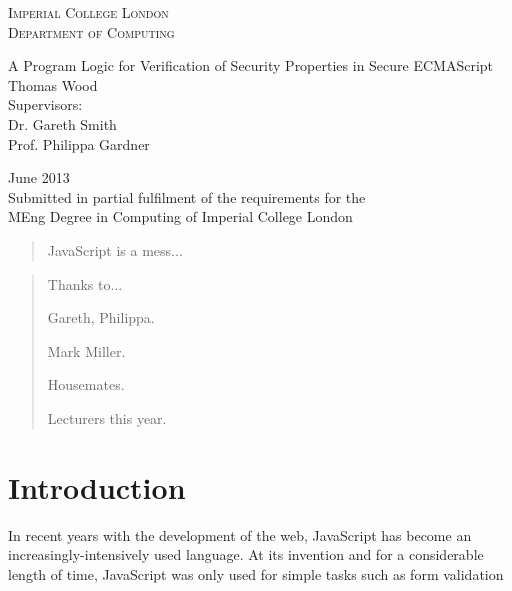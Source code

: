 \documentclass[a4paper]{report}
\begin{document}
\begin{titlepage}
\begin{center}
  \textsc{\Large Imperial College London} \\[0.1cm]
  \textsc{\Large Department of Computing}

  \vfill

  {\Huge A Program Logic for Verification of Security Properties in Secure
  ECMAScript} \\[3cm]

  {\LARGE Thomas Wood} \\[1cm]

  {\large Supervisors:\\
  Dr. Gareth Smith \\
  Prof. Philippa Gardner}

  \vfill

  {\Large June 2013} \\[0.5cm]

  Submitted in partial fulfilment of the requirements for the\\
  MEng Degree in Computing of Imperial College London
\end{center}
\end{titlepage}

\begin{abstract}
  JavaScript is a mess...
\end{abstract}

\renewcommand{\abstractname}{Acknowledgements}
\begin{abstract}
  Thanks to...

  Gareth, Philippa.

  Mark Miller.

  Housemates.

  Lecturers this year.
\end{abstract}

\tableofcontents

\chapter{Introduction}


  In recent years with the development of the web, JavaScript has become an
  increasingly-intensively used language. At its invention and for a
  considerable length of time, JavaScript was only used for simple tasks such as
  form validation
  
\end{document}
